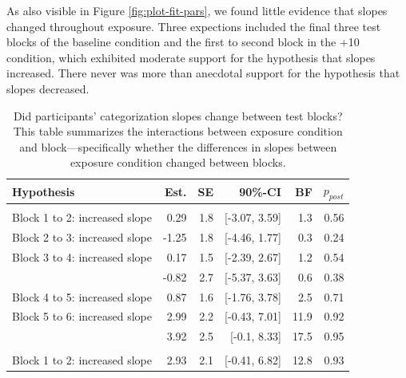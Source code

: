 \documentclass[
  11pt,
  man,mask,floatsintext]{apa6}
\begin{document}
As also visible in Figure \ref{fig:plot-fit-pars}, we found little evidence that slopes changed throughout exposure. Three expections included the final three test blocks of the baseline condition and the first to second block in the +10 condition, which exhibited moderate support for the hypothesis that slopes increased. There never was more than anecdotal support for the hypothesis that slopes decreased.

\begin{table}[H]
\centering
\caption{\label{tab:hypothesis-table-simple-slopes-block}Did participants' categorization slopes change between test blocks? This table summarizes the interactions between exposure condition and block---specifically whether the differences in slopes between exposure condition changed between blocks.}
\centering
\begin{tabular}[t]{>{\raggedright\arraybackslash}p{15em}rrrrr}
\toprule
Hypothesis & Est. & SE & 90\%-CI & BF & $p_{post}$\\
\midrule
\addlinespace[0.3em]
\multicolumn{6}{l}{\textbf{Difference between blocks: baseline}}\\
\hspace{1em}Block 1 to 2: increased slope & 0.29 & 1.8 & {}[-3.07, 3.59] & 1.3 & 0.56\\
\hspace{1em}Block 2 to 3: increased slope & -1.25 & 1.8 & {}[-4.46, 1.77] & 0.3 & 0.24\\
\hspace{1em}Block 3 to 4: increased slope & 0.17 & 1.5 & {}[-2.39, 2.67] & 1.2 & 0.54\\
\hspace{1em}{\em Block 1 to 4: increased slope} & -0.82 & 2.7 & {}[-5.37, 3.63] & 0.6 & 0.38\\
\hspace{1em}Block 4 to 5: increased slope & 0.87 & 1.6 & {}[-1.76, 3.78] & 2.5 & 0.71\\
\hspace{1em}Block 5 to 6: increased slope & 2.99 & 2.2 & {}[-0.43, 7.01] & 11.9 & 0.92\\
\hspace{1em}{\em Block 4 to 6: increased slope} & 3.92 & 2.5 & {}[-0.1, 8.33] & 17.5 & 0.95\\
\addlinespace[0.3em]
\multicolumn{6}{l}{\textbf{Difference between blocks: +10}}\\
\hspace{1em}Block 1 to 2: increased slope & 2.93 & 2.1 & {}[-0.41, 6.82] & 12.8 & 0.93\\

\end{tabular}
\end{table}
\end{document}

